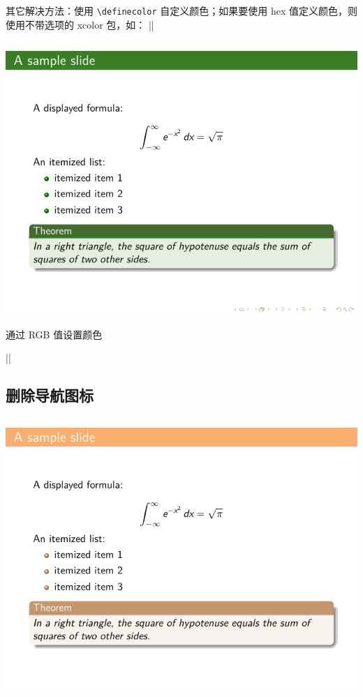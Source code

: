 \begin{column}{0.5\textwidth}
\begin{remark*}
  其它解决方法：使用 \verb|\definecolor| 自定义颜色；如果要使用 hex 值定义颜色，则使用不带选项的 xcolor 包，如：
  ||
\end{remark*}



\inputminted[linenos=true]{latex}{examples/beamer/beamertheme04.tex}

\includegraphics{examples/beamer/beamertheme04.pdf}

通过 RGB 值设置颜色

|| 

\subsection{删除导航图标}

\inputminted[linenos=true]{latex}{examples/beamer/beamertheme05.tex}

\includegraphics{examples/beamer/beamertheme05.pdf}


\end{column}
